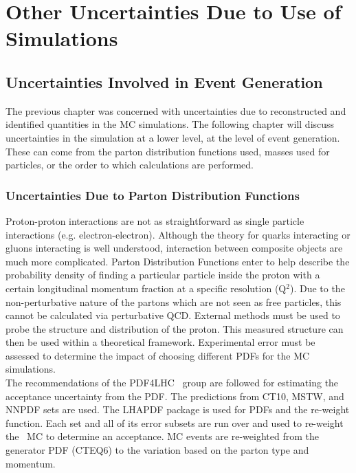 \chapter{Other Uncertainties Due to Use of Simulations}
\section{Uncertainties  Involved in Event Generation}
The previous chapter was concerned with uncertainties due to reconstructed and identified quantities in the MC simulations. The following chapter will discuss uncertainties in the simulation at a lower level, at the level of event generation. These can come from the parton distribution functions used, masses used for particles, or the order to which calculations are performed.\\ 

\subsection{Uncertainties Due to Parton Distribution Functions}	
Proton-proton interactions are not as straightforward as single particle interactions (e.g. electron-electron). Although the theory for quarks interacting or gluons interacting is well understood, interaction between composite objects are much more complicated. Parton Distribution Functions enter to help describe the probability density of finding a particular particle inside the proton with a certain longitudinal momentum fraction at a specific resolution (Q$^2$). Due to the non-perturbative nature of the partons which are not seen as free particles, this cannot be calculated via perturbative QCD. External methods must be used to probe the structure and distribution of the proton. This measured structure can then be used within a theoretical framework. Experimental error must be assessed to determine the impact of choosing different PDFs for the MC simulations.\\

The recommendations of the PDF4LHC~\cite{PDF4LHC} group are followed for estimating the acceptance uncertainty from the PDF. The predictions from CT10, MSTW, and NNPDF sets are used. The LHAPDF package is used for PDFs and the re-weight function. Each set and all of its error subsets are run over and used to re-weight the \ttZ \ MC to determine an acceptance. MC events are re-weighted from the generator PDF (CTEQ6) to the variation based on the parton type and momentum.\\

